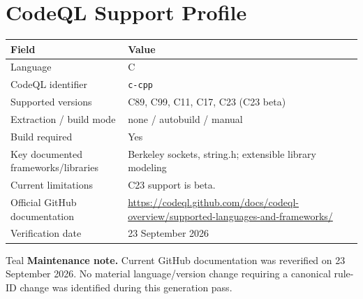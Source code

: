 \documentclass[10pt,letterpaper]{article}
\newcommand{\code}[1]{\texttt{\small #1}}
\begin{document}
\section{CodeQL Support Profile}
\begin{tabularx}{\textwidth}{@{}P{1.9in}Y@{}}
\toprule
\textbf{Field} & \textbf{Value}\\
\midrule
Language & C\\
CodeQL identifier & \code{c-cpp}\\
Supported versions & C89, C99, C11, C17, C23 (C23 beta)\\
Extraction / build mode & none / autobuild / manual\\
Build required & Yes\\
Key documented frameworks/libraries & Berkeley sockets, string.h; extensible library modeling\\
Current limitations & C23 support is beta.\\
Official GitHub documentation & \url{https://codeql.github.com/docs/codeql-overview/supported-languages-and-frameworks/}\\
Verification date & 23 September 2026\\
\bottomrule
\end{tabularx}
\begin{callout}{Teal}
\textbf{Maintenance note.} Current GitHub documentation was reverified on 23 September 2026. No material language/version change requiring a canonical rule-ID change was identified during this generation pass.
\end{callout}
\end{document}
